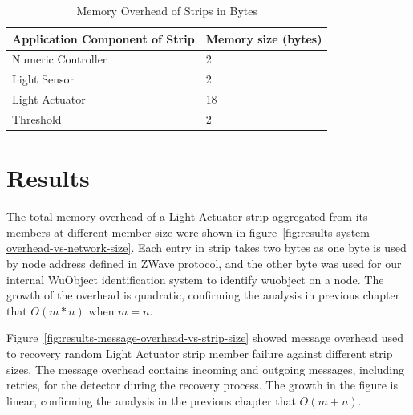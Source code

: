 \begin{table}
\centering
\caption{Memory Overhead of Strips in Bytes}
\label{tbl:results-memory-overhead-strip}
  \begin{tabular}{|l|l|}
  \hline
  \textbf{Application Component of Strip} & \textbf{Memory size (bytes)} \\
  \hline
  Numeric Controller & 2 \\
  \hline
  Light Sensor & 2 \\
  \hline
  Light Actuator & 18 \\
  \hline
  Threshold & 2 \\
  \hline
  \end{tabular}
\end{table}







\section{Results}
\label{s:results}

The total memory overhead of a Light Actuator strip aggregated from its members
at different member size were shown in
figure~\ref{fig:results-system-overhead-vs-network-size}. Each entry in strip
takes two bytes as one byte is used by node address defined in ZWave protocol,
and the other byte was used for our internal WuObject identification system to
identify wuobject on a node. The growth of the overhead is quadratic, confirming
the analysis in previous chapter that $O(m*n)$ when $m = n$. 

Figure~\ref{fig:results-message-overhead-vs-strip-size} showed message overhead
used to recovery random Light Actuator strip member failure against different
strip sizes. The message overhead contains incoming and outgoing messages,
including retries, for the detector during the recovery process. The growth in
the figure is linear, confirming the analysis in the previous chapter that $O(m+n)$.

